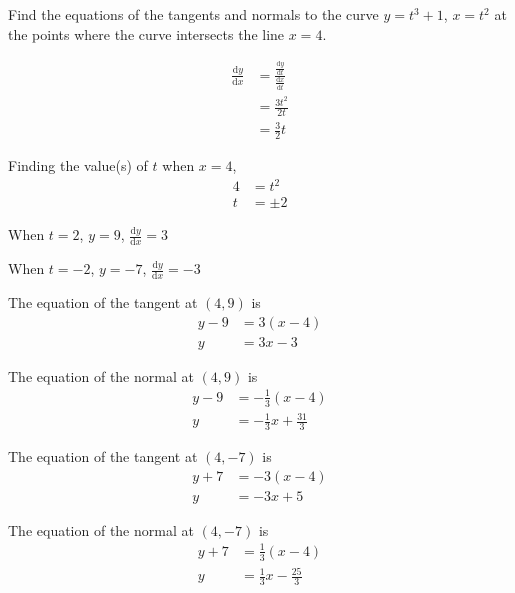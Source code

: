 \documentclass[11pt,a4paper]{book}
\begin{document}
\begin{example}

Find the equations of the tangents and normals to the curve $y=t^{3}+1$,
$x=t^{2}$ at the points where the curve intersects the line $x=4$.

\Solution

\begin{minipage}[t]{0.45\textwidth}

\begin{align*}
\frac{\mathrm{d}y}{\mathrm{d}x} & =\frac{\frac{\mathrm{d}y}{\mathrm{d}t}}{\frac{\mathrm{d}x}{\mathrm{d}t}}\\
 & =\frac{3t^{2}}{2t}\\
 & =\frac{3}{2}t
\end{align*}

Finding the value(s) of $t$ when $x=4$,
\begin{align*}
4 & =t^{2}\\
t & =\pm2
\end{align*}

When $t=2$, $y=9$, ${\displaystyle \frac{\mathrm{d}y}{\mathrm{d}x}=3}$

When $t=-2$, $y=-7$, ${\displaystyle \frac{\mathrm{d}y}{\mathrm{d}x}=-3}$

\end{minipage}
\vline\hfill
\begin{minipage}[t]{0.5\textwidth}

The equation of the tangent at $\left(4,9\right)$ is
\begin{align*}
y-9 & =3\left(x-4\right)\\
y & =3x-3
\end{align*}

The equation of the normal at $\left(4,9\right)$ is
\begin{align*}
y-9 & =-\frac{1}{3}\left(x-4\right)\\
y & =-\frac{1}{3}x+\frac{31}{3}
\end{align*}

The equation of the tangent at $\left(4,-7\right)$ is
\begin{align*}
y+7 & =-3\left(x-4\right)\\
y & =-3x+5
\end{align*}

The equation of the normal at $\left(4,-7\right)$ is
\begin{align*}
y+7 & =\frac{1}{3}\left(x-4\right)\\
y & =\frac{1}{3}x-\frac{25}{3}
\end{align*}

\end{minipage}

\end{example}
\end{document}
